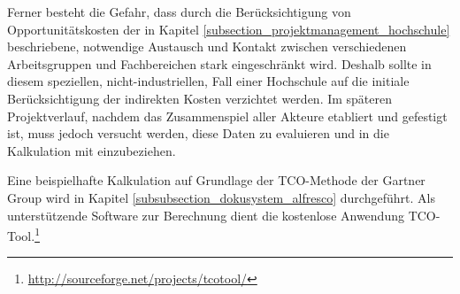 Ferner besteht die Gefahr, dass durch die Berücksichtigung von Opportunitätskosten der in Kapitel \ref{subsection_projektmanagement_hochschule} beschriebene, notwendige Austausch und Kontakt zwischen verschiedenen Arbeitsgruppen und Fachbereichen stark eingeschränkt wird. Deshalb sollte in diesem speziellen, nicht-industriellen, Fall einer Hochschule auf die initiale Berücksichtigung der indirekten Kosten verzichtet werden. Im späteren Projektverlauf, nachdem das Zusammenspiel aller Akteure etabliert und gefestigt ist, muss jedoch versucht werden, diese Daten zu evaluieren und in die Kalkulation mit einzubeziehen.

Eine beispielhafte Kalkulation auf Grundlage der TCO-Methode der Gartner Group wird in Kapitel \ref{subsubsection_dokusystem_alfresco} durchgeführt. Als unterstützende Software zur Berechnung dient die kostenlose Anwendung TCO-Tool.\footnote{\url{http://sourceforge.net/projects/tcotool/}}